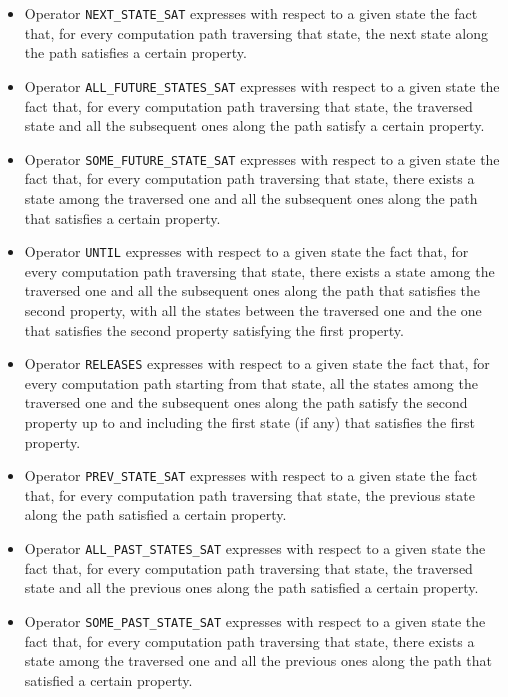 \begin{itemize}
\item Operator {\tt NEXT\_STATE\_SAT} expresses with respect to a given state the fact that, for every
computation path traversing that state, the next state along the path satisfies a certain property.

\item Operator {\tt ALL\_FUTURE\_STATES\_SAT} expresses with respect to a given state the fact that, for
every computation path traversing that state, the traversed state and all the subsequent ones along the path
satisfy a certain property.

\item Operator {\tt SOME\_FUTURE\_STATE\_SAT} expresses with respect to a given state the fact that, for
every computation path traversing that state, there exists a state among the traversed one and all the
subsequent ones along the path that satisfies a certain property.

\item Operator {\tt UNTIL} expresses with respect to a given state the fact that, for every computation path
traversing that state, there exists a state among the traversed one and all the subsequent ones along the
path that satisfies the second property, with all the states between the traversed one and the one that
satisfies the second property satisfying the first property.

\item Operator {\tt RELEASES} expresses with respect to a given state the fact that, for every computation
path starting from that state, all the states among the traversed one and the subsequent ones along the path
satisfy the second property up to and including the first state (if any) that satisfies the first property.

\item Operator {\tt PREV\_STATE\_SAT} expresses with respect to a given state the fact that, for every
computation path traversing that state, the previous state along the path satisfied a certain property.

\item Operator {\tt ALL\_PAST\_STATES\_SAT} expresses with respect to a given state the fact that, for every
computation path traversing that state, the traversed state and all the previous ones along the path
satisfied a certain property.

\item Operator {\tt SOME\_PAST\_STATE\_SAT} expresses with respect to a given state the fact that, for every
computation path traversing that state, there exists a state among the traversed one and all the previous
ones along the path that satisfied a certain property.


\end{itemize}
